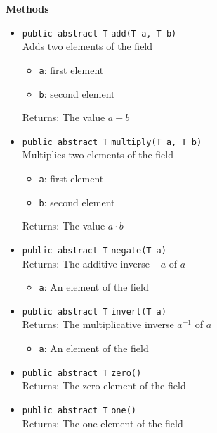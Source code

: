 \textbf{Methods}
\begin{itemize}
\item \lstinline|public abstract T| \lstinline|add|\lstinline|(T a, T b)|\\
Adds two elements of the field
\begin{itemize}
\item \lstinline|a|: first element
\item \lstinline|b|: second element
\end{itemize}

Returns: The value $a + b$

\item \lstinline|public abstract T| \lstinline|multiply|\lstinline|(T a, T b)|\\
Multiplies two elements of the field
\begin{itemize}
\item \lstinline|a|: first element
\item \lstinline|b|: second element
\end{itemize}

Returns: The value $a \cdot b$

\item \lstinline|public abstract T| \lstinline|negate|\lstinline|(T a)|\\
Returns: The additive inverse $-a$ of $a$
\begin{itemize}
\item \lstinline|a|: An element of the field
\end{itemize}



\item \lstinline|public abstract T| \lstinline|invert|\lstinline|(T a)|\\
Returns: The multiplicative inverse $a^{-1}$ of $a$
\begin{itemize}
\item \lstinline|a|: An element of the field
\end{itemize}



\item \lstinline|public abstract T| \lstinline|zero|\lstinline|()|\\
Returns: The zero element of the field



\item \lstinline|public abstract T| \lstinline|one|\lstinline|()|\\
Returns: The one element of the field




\end{itemize}
